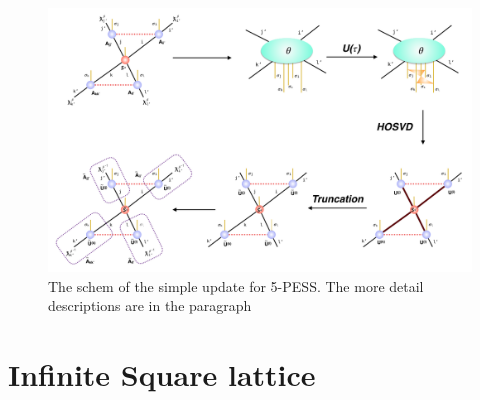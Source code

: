 \begin{figure}[ht]
	\centering
	\includegraphics[width=1.00\textwidth]{figures/fig4324.png}
	\caption[The schem of the simple update for 5-PESS.]{The schem of the simple update for 5-PESS. The more detail descriptions are in the paragraph}
	\label{fig4324}
\end{figure}
\section{Infinite Square lattice}
